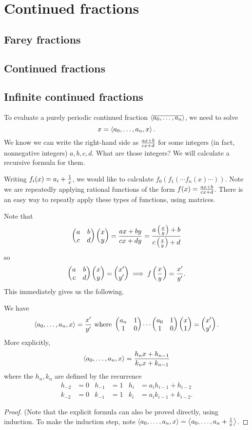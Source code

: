 \chapter{Continued fractions}
\section{Farey fractions}
\section{Continued fractions}
\section{Infinite continued fractions}
To evaluate a purely periodic continued fraction $\left\langle {\overline{a_0,\ldots, a_n}}\right\rangle$, we need to solve
\[
x=\left\langle {a_0,\ldots, a_n,x}\right\rangle.
\]
We know we can write the right-hand side as $\frac{ax+b}{cx+d}$ for some integers (in fact, nonnegative integers) $a,b,c,d$. What are those integers? We will calculate a recursive formula for them.

Writing $f_i(x)=a_i+\frac{1}{x}$, we would like to calculate $f_0(f_1(\cdots f_n(x)\cdots))$. Note we are repeatedly applying rational functions of the form $f(x)=\frac{ax+b}{cx+d}$. There is an easy way to repeatly apply these types of functions, using matrices.

Note that
\[
\begin{pmatrix} {a}&{b}\\ {c}&{d} \end{pmatrix} \begin{pmatrix} {x}\\ {y} \end{pmatrix}=\frac{ax+by}{cx+dy}=\frac{a\left( {\frac{x}{y}} \right)+b}{c\left( {\frac{x}{y}} \right)+d}
\]
so
\begin{equation}
\begin{pmatrix} {a}&{b}\\ {c}&{d} \end{pmatrix} \begin{pmatrix} {x}\\ {y} \end{pmatrix}=\begin{pmatrix} {x'}\\ {y'} \end{pmatrix} \implies f\left( {\frac{x}{y}} \right) =\frac{x'}{y'}.
\end{equation}
This immediately gives us the following.
\begin{pr}
We have 
\[
\left\langle {a_0,\ldots, a_n,x}\right\rangle=\frac{x'}{y'} \text{ where } \begin{pmatrix} {a_n}&{1}\\ {1}&{0} \end{pmatrix}\cdots \begin{pmatrix} {a_0}&{1}\\ {1}&{0} \end{pmatrix}\begin{pmatrix} {x}\\ {1} \end{pmatrix}=\begin{pmatrix} {x'}\\ {y'} \end{pmatrix}.
\]
More explicitly,
\[
\left\langle {a_0,\ldots, a_n,x}\right\rangle=\frac{h_nx+h_{n-1}}{k_nx+k_{n-1}}
\]
where the $h_n,k_n$ are defined by the recurrence
\begin{align*}
h_{-2}&=0& h_{-1}&=1&h_i&=a_ih_{i-1}+h_{i-2}\\
k_{-2}&=0& k_{-1}&=1&k_i&=a_ik_{i-1}+k_{i-2}.
\end{align*}
\end{pr}
\begin{proof}
(Note that the explicit formula can also be proved directly, using induction. To make the induction step, note $\left\langle {a_0,\ldots, a_n,x}\right\rangle=\left\langle {a_0,\ldots, a_n+\frac{1}{x}}\right\rangle$.
\end{proof}
